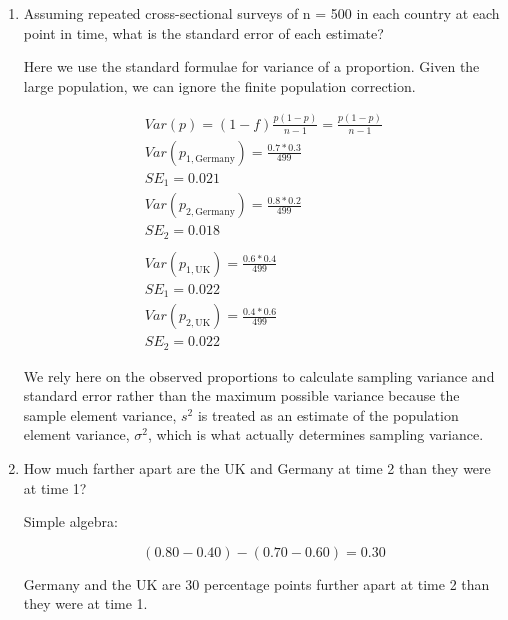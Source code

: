 \documentclass[a4paper]{exam}
\begin{document}
\begin{enumerate}
	\begin{enumerate}
	\item Assuming repeated cross-sectional surveys of n = 500 in each country at each point in time, what is the standard error of each estimate?
	
	\begin{solution}
	
	Here we use the standard formulae for variance of a proportion. Given the large population, we can ignore the finite population correction.
	
	\begin{align*}
	Var(p) = (1-f)\frac{p(1-p)}{n-1} = \frac{p(1-p)}{n-1}\\
	Var(p_{1,\text{Germany}}) = \frac{0.7*0.3}{499}\\
	SE_1 = 0.021\\
	Var(p_{2,\text{Germany}}) = \frac{0.8*0.2}{499}\\
	SE_2 = 0.018\\
	 \\
	Var(p_{1,\text{UK}}) = \frac{0.6*0.4}{499}\\
	SE_1 = 0.022\\
	Var(p_{2,\text{UK}}) = \frac{0.4*0.6}{499}\\
	SE_2 = 0.022
	\end{align*}
	
	We rely here on the observed proportions to calculate sampling variance and standard error rather than the maximum possible variance because the sample element variance, $s^2$ is treated as an estimate of the population element variance, $\sigma^2$, which is what actually determines sampling variance.
	
	\end{solution}
	
	\item How much farther apart are the UK and Germany at time 2 than they were at time 1?
	
	\begin{solution}
	
	Simple algebra:
	
	\begin{equation}
	(0.80 - 0.40) - (0.70 - 0.60) = 0.30
	\end{equation}
	
	Germany and the UK are 30 percentage points further apart at time 2 than they were at time 1.
	
	\end{solution}
	

\end{enumerate}
\end{enumerate}
\end{document}

